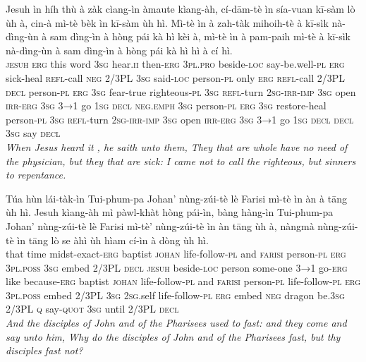 \documentclass[11pt,a4paper]{article}
\begin{document}
\begin{exe}
\gll Jesuh ìn híh thù à zàk cìang-ìn àmaute kìang-àh, cí-dām-tè ìn sía-vuan kī-sàm lò ùh à, cin-à mì-tè bèk ìn kī-sàm ùh hì. Mì-tè ìn à zah-tàk mihoih-tè à kī-sìk nà-dìng-ùn à sam dìng-ìn à hòng pái kà hì kèi à, mì-tè ìn à pam-paih mì-tè à kī-sìk nà-dìng-ùn à sam dìng-ìn à hòng pái kà hì hì à cí hì. \\
     \textsc{jesuh} \textsc{erg} this word \textsc{3sg} hear.\textsc{ii} then-\textsc{erg} \textsc{3pl}.\textsc{pro} beside-\textsc{loc} say-be.well-\textsc{pl} \textsc{erg} sick-heal \textsc{refl}-call \textsc{neg} 2/3PL \textsc{3sg} said-\textsc{loc} person-\textsc{pl} only \textsc{erg} \textsc{refl}-call 2/3PL \textsc{decl} person-\textsc{pl} \textsc{erg} \textsc{3sg} fear-true righteous-\textsc{pl} \textsc{3sg} \textsc{refl}-turn \textsc{2sg}-\textsc{irr}-\textsc{imp} \textsc{3sg} open \textsc{irr}-\textsc{erg} \textsc{3sg} \textsc{3→1} go \textsc{1sg} \textsc{decl} \textsc{neg}.\textsc{emph} \textsc{3sg} person-\textsc{pl} \textsc{erg} \textsc{3sg} restore-heal person-\textsc{pl} \textsc{3sg} \textsc{refl}-turn \textsc{2sg}-\textsc{irr}-\textsc{imp} \textsc{3sg} open \textsc{irr}-\textsc{erg} \textsc{3sg} \textsc{3→1} go \textsc{1sg} \textsc{decl} \textsc{decl} \textsc{3sg} say \textsc{decl} \\
\glt \textcolor{kjvcolor}{\textit{When Jesus heard it , he saith unto them, They that are whole have no need of the physician, but they that are sick: I came not to call the righteous, but sinners to repentance.}}

\gll Túa hùn lái-tàk-ìn Tui-phum-pa Johan' nùng-zúi-tè lè Farisi mì-tè ìn àn à tāng ùh hì. Jesuh kìang-àh mì pàwl-khàt hòng pái-ìn, bàng hàng-ìn Tui-phum-pa Johan' nùng-zúi-tè lè Farisi mì-tè' nùng-zúi-tè ìn àn tāng ùh à, nàngmà nùng-zúi-tè ìn tāng lò se àhì ùh hìam cí-ìn à dòng ùh hì. \\
     that time midst-exact-\textsc{erg} baptist \textsc{johan} life-follow-\textsc{pl} and \textsc{farisi} person-\textsc{pl} \textsc{erg} \textsc{3pl}.\textsc{poss} \textsc{3sg} embed 2/3PL \textsc{decl} \textsc{jesuh} beside-\textsc{loc} person some-one \textsc{3→1} go-\textsc{erg} like because-\textsc{erg} baptist \textsc{johan} life-follow-\textsc{pl} and \textsc{farisi} person-\textsc{pl} life-follow-\textsc{pl} \textsc{erg} \textsc{3pl}.\textsc{poss} embed 2/3PL \textsc{3sg} \textsc{2sg}.self life-follow-\textsc{pl} \textsc{erg} embed \textsc{neg} dragon be.\textsc{3sg} 2/3PL \textsc{q} say-\textsc{quot} \textsc{3sg} until 2/3PL \textsc{decl} \\
\glt \textcolor{kjvcolor}{\textit{And the disciples of John and of the Pharisees used to fast: and they come and say unto him, Why do the disciples of John and of the Pharisees fast, but thy disciples fast not?}}


\end{exe}
\end{document}
